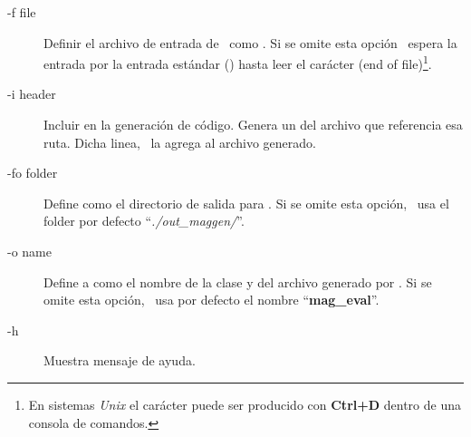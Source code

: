 \begin{description}
\item [-f  file] Definir el archivo de entrada de \maggen\ como . Si se omite esta opción \maggen\ espera la entrada por la entrada estándar () hasta leer el carácter  (end of file)\footnote{En sistemas \textit{Unix} el carácter  puede ser producido con \textbf{Ctrl+D} dentro de una consola de comandos.}.

\item [-i  header] Incluir  en la generación de código. Genera un  del archivo que referencia esa ruta. Dicha linea, \maggen\ la agrega al archivo generado.

\item [-fo folder] Define  como el directorio de salida para \maggen. Si se omite esta opción, \maggen\ usa el folder por defecto ``\textit{./out\_maggen/}''.

\item [-o  name] Define a  como el nombre de la clase y del archivo generado por \maggen. Si se omite esta opción, \maggen\ usa por defecto el nombre ``\textbf{mag\_eval}''.

\item [-h] Muestra mensaje de ayuda.
\end{description}

